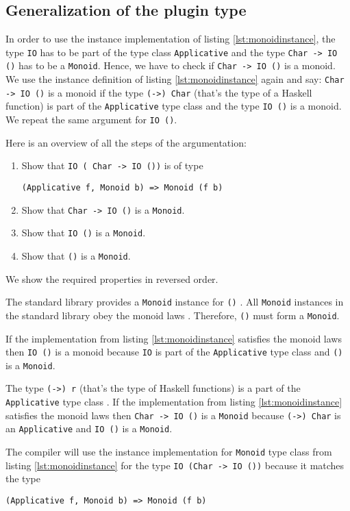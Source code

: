 \subsection{Generalization of the plugin type }
\label{sec:generalization}

In order to use the instance implementation of listing \ref{lst:monoidinstance}, the type \verb|IO| has to be part of the type class \verb|Applicative| and the type \verb|Char -> IO ()| has to be a \verb|Monoid|. 
Hence, we have to check if \verb|Char -> IO ()| is a monoid. We use the instance definition of listing \ref{lst:monoidinstance} again and say: \verb|Char -> IO ()| is a monoid if the type \verb|(->) Char| (that's the type of a Haskell function) is part of the \verb|Applicative| type class and the type \verb|IO ()| is a monoid. We repeat the same argument for \verb|IO ()|.

Here is an overview of all the steps of the argumentation:
\begin{enumerate}
\item Show that  \verb|IO ( Char -> IO ())| is of type 
\begin{verbatim}
(Applicative f, Monoid b) => Monoid (f b)
\end{verbatim}
\item Show that \verb|Char -> IO ()| is a \verb|Monoid|.
\item Show that \verb|IO ()| is a \verb|Monoid|.
\item Show that \verb|()| is a \verb|Monoid|.
\end{enumerate}

We show the required properties in reversed order.

\begin{etaremune}
\item The standard library provides a \verb|Monoid| instance for \verb|()| \cite{monoid}. All \verb|Monoid| instances in the standard library obey the monoid laws \cite{Lipovaca}. Therefore, \verb|()| must form a \verb|Monoid|.

\item If the implementation from listing \ref{lst:monoidinstance} satisfies the monoid laws then \verb|IO ()| is a monoid because \verb|IO| is part of the \verb|Applicative| type class \cite{control.applicative} and \verb|()| is a \verb|Monoid|.

\item The type \verb|(->) r| (that's the type of Haskell functions) is a part of the \verb|Applicative| type class \cite{control.applicative}.
If the implementation from listing \ref{lst:monoidinstance} satisfies the monoid laws then \verb|Char -> IO ()| is a \verb|Monoid| because \verb|(->) Char| is an \verb|Applicative| and \verb|IO ()| is a \verb|Monoid|.

\item The compiler will use the instance implementation for \verb|Monoid| type class from listing \ref{lst:monoidinstance} for the type \verb|IO (Char -> IO ())| because it matches the type
\begin{verbatim}
(Applicative f, Monoid b) => Monoid (f b)
\end{verbatim}

\end{etaremune} 


